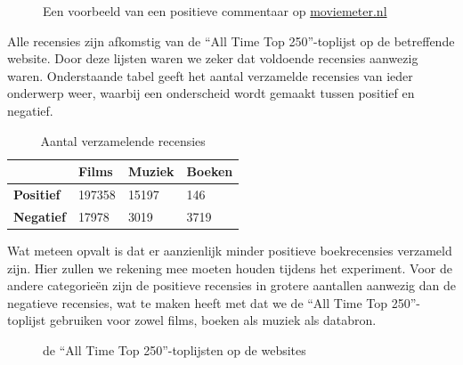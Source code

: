 \begin{figure}[h]%
    \centering
    \caption{Een voorbeeld van een positieve commentaar op \url{moviemeter.nl}}%
\end{figure}
\newline
Alle recensies zijn afkomstig van de ``All Time Top 250''-toplijst op de betreffende website. Door deze lijsten waren we zeker dat voldoende recensies aanwezig waren. Onderstaande tabel geeft het aantal verzamelde recensies van ieder onderwerp weer, waarbij een onderscheid wordt gemaakt tussen positief en negatief.\\

\begin{table}[h]
\centering
\begin{tabular}{l|l|l|l|}
\cline{2-4}
                                        & \textbf{Films} & \textbf{Muziek} & \textbf{Boeken} \\ \hline
\multicolumn{1}{|l|}{\textbf{Positief}} & 197358         & 15197           & 146             \\ \hline
\multicolumn{1}{|l|}{\textbf{Negatief}} & 17978          & 3019            & 3719            \\ \hline
\end{tabular}
\caption{Aantal verzamelende recensies} 
\end{table}

Wat meteen opvalt is dat er aanzienlijk minder positieve boekrecensies verzameld zijn. Hier zullen we rekening mee moeten houden tijdens het experiment. Voor de andere categorie\"en zijn de positieve recensies in grotere aantallen aanwezig dan de negatieve recensies, wat te maken heeft met dat we de ``All Time Top 250''-toplijst gebruiken voor zowel films, boeken als muziek als databron.
\newpage
\begin{figure}%
    \centering
    \caption{de ``All Time Top 250''-toplijsten op de websites}%
\end{figure}

